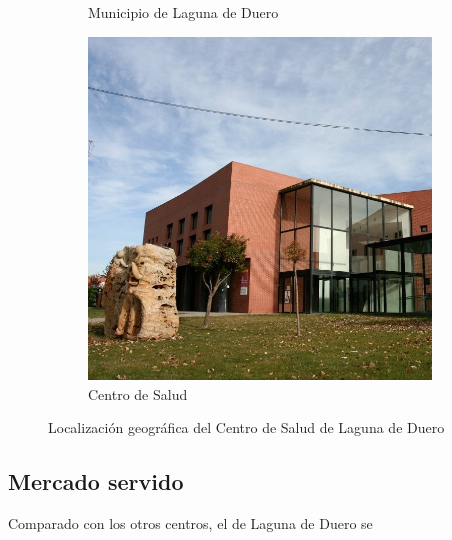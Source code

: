 \begin{figure}[H]
\begin{subfigure}[H]{0.48\textwidth}
        \caption{Municipio de Laguna de Duero}
    \end{subfigure}
    \hfill
    \begin{subfigure}[H]{0.48\textwidth}
        \centering
        \includegraphics*[width=\textwidth]{img/centro-salud.jpg}
        \caption{Centro de Salud}
    \end{subfigure}
    \caption{Localización geográfica del Centro de Salud de Laguna de Duero}
    \label{fig:localizacion-centro}
\end{figure}

\subsection{Mercado servido}

Comparado con los otros centros, el de Laguna de Duero se


